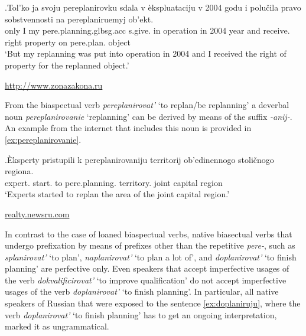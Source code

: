 \bg.\label{ex:pereplanirovat:part}Tol'ko ja svoju pereplanirovku sdala v \`{e}kspluataciju v 2004 godu i polu\v{c}ila pravo sobstvennosti na pereplaniruemyj ob'ekt.\\
only I my pere.planning.glb{sg.acc} s.give. in operation in 2004 year and receive. right property on pere.plan. object\\
\vspace{0.5em}
`But my replanning was put into operation in 2004 and I received the right of property for the replanned object.'
\begin{flushright}
\vspace{-0.5em}
\url{http://www.zonazakona.ru}
\end{flushright}

From the biaspectual verb \textit{pereplanirovat'} `to replan/be replanning' a deverbal noun \textit{pereplanirovanie} `replanning' can be derived by means of the suffix \textit{-anij-}. An example from the internet that includes this noun is provided in \ref{ex:pereplanirovanie}.

\exg.\label{ex:pereplanirovanie}\`{E}ksperty pristupili k pereplanirovaniju territorij ob'edinennogo stoli\v{c}nogo regiona.\\
expert. start. to pere.planning. territory. joint capital region\\
\vspace{0.5em}
`Experts started to replan the area of the joint capital region.'
\begin{flushright}
\vspace{-0.5em}
\url{realty.newsru.com}
\end{flushright}

In contrast to the case of loaned biaspectual verbs, native biasectual verbs that undergo prefixation by means of prefixes other than the repetitive \textit{pere-}, such as \textit{splanirovat'} `to plan', \textit{naplanirovat'} `to plan a lot of', and \textit{doplanirovat'} `to finish planning' are perfective only. Even speakers that accept imperfective usages of the verb \textit{dokvalificirovat'} `to improve qualification' do not accept imperfective usages of the verb \textit{doplanirovat'} `to finish planning'. In particular, all native speakers of Russian that were exposed to the sentence \ref{ex:doplaniruju}, where the verb \textit{doplanirovat'} `to finish planning' has to get an ongoing interpretation, marked it as ungrammatical.

